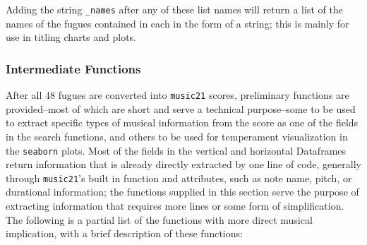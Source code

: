 Adding the string \texttt{\textquotesingle{}\_names\textquotesingle{}}
after any of these list names will return a list of the names of the
fugues contained in each in the form of a string; this is mainly for use
in titling charts and plots.

\subsubsection{Intermediate Functions}\label{intermediate-functions}

After all 48 fugues are converted into \texttt{music21} scores,
preliminary functions are provided--most of which are short and serve
a technical purpose--some to be used to extract specific types of
musical information from the score as one of the fields in the search
functions, and others to be used for temperament visualization in the
\texttt{seaborn} plots. Most of the fields in the vertical and
horizontal Dataframes return information that is already directly
extracted by one line of code, generally through \texttt{music21}'s
built in function and attributes, such as note name, pitch, or
durational information; the functions supplied in this section serve the
purpose of extracting information that requires more lines or some form
of simplification. The following is a partial list of the functions with
more direct musical implication, with a brief description of these
functions:

